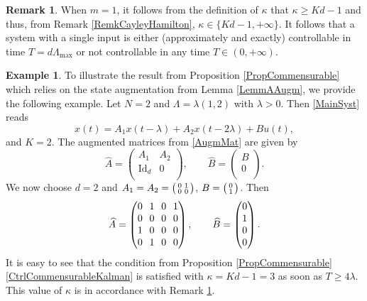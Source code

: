 \documentclass[10pt]{amsart}
\newenvironment{smallpmatrix}{\big(\begin{smallmatrix}}{\end{smallmatrix}\big)}
\theoremstyle{plain}
\theoremstyle{definition}
\newtheorem{remk}[theo]{Remark}
\newtheorem{expl}[theo]{Example}
\DeclareMathOperator{\id}{Id}
\begin{document}
\begin{remk}
\label{RemkKappaSingleInput}
When $m = 1$, it follows from the definition of $\kappa$ that $\kappa \geq K d - 1$ and thus, from Remark \ref{RemkCayleyHamilton}, $\kappa \in \{K d - 1, +\infty\}$. It follows that a system with a single input is either (approximately and exactly) controllable in time $T = d \Lambda_{\max}$ or not controllable in any time $T \in (0, +\infty)$.
\end{remk}

\begin{expl}
To illustrate the result from Proposition \ref{PropCommensurable} which relies on the state augmentation from Lemma \ref{LemmAAugm}, we provide the following example. Let $N = 2$ and $\Lambda = \lambda(1, 2)$ with $\lambda > 0$. Then \eqref{MainSyst} reads
\[x(t) = A_1 x(t - \lambda) + A_2 x(t - 2 \lambda) + B u(t),\]
and $K = 2$. The augmented matrices from \eqref{AugmMat} are given by
\[
\widehat A =
\begin{pmatrix}
A_1 & A_2 \\
\id_d & 0 \\
\end{pmatrix}, \qquad \widehat B =
\begin{pmatrix}
B \\ 0 \\
\end{pmatrix}.
\]
We now choose $d = 2$ and $A_1 = A_2 = \begin{smallpmatrix}0 & 1 \\ 0 & 0\\\end{smallpmatrix}$, $B = \begin{smallpmatrix}0 \\ 1 \\\end{smallpmatrix}$. Then
\[\arraycolsep3.5pt
\widehat A =
\begin{pmatrix}
0 & 1 & 0 & 1 \\
0 & 0 & 0 & 0 \\
1 & 0 & 0 & 0 \\
0 & 1 & 0 & 0 \\
\end{pmatrix}, \qquad \widehat B =
\begin{pmatrix}
0 \\
1 \\
0 \\
0 \\
\end{pmatrix}.
\]
It is easy to see that the condition from Proposition \ref{PropCommensurable}\eqref{CtrlCommensurableKalman} is satisfied with $\kappa = K d - 1 = 3$ as soon as $T \geq 4 \lambda$. This value of $\kappa$ is in accordance with Remark \ref{RemkKappaSingleInput}.
\end{expl}
\end{document}
